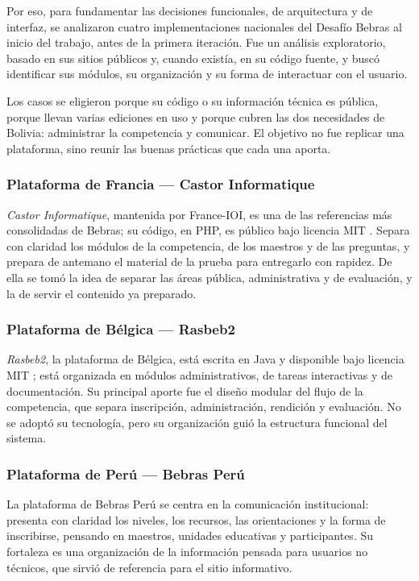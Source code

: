 Por eso, para fundamentar las decisiones funcionales, de arquitectura y de interfaz, se analizaron cuatro implementaciones nacionales del Desafío Bebras al inicio del trabajo, antes de la primera iteración. Fue un análisis exploratorio, basado en sus sitios públicos y, cuando existía, en su código fuente, y buscó identificar sus módulos, su organización y su forma de interactuar con el usuario.

Los casos se eligieron porque su código o su información técnica es pública, porque llevan varias ediciones en uso y porque cubren las dos necesidades de Bolivia: administrar la competencia y comunicar. El objetivo no fue replicar una plataforma, sino reunir las buenas prácticas que cada una aporta.

\subsubsection{Plataforma de Francia --- Castor Informatique}

\emph{Castor Informatique}, mantenida por France-IOI, es una de las referencias más consolidadas de Bebras; su código, en PHP, es público bajo licencia MIT \parencite{bebrasfrancia,franceioirepo}. Separa con claridad los módulos de la competencia, de los maestros y de las preguntas, y prepara de antemano el material de la prueba para entregarlo con rapidez. De ella se tomó la idea de separar las áreas pública, administrativa y de evaluación, y la de servir el contenido ya preparado.

\subsubsection{Plataforma de Bélgica --- Rasbeb2}

\emph{Rasbeb2}, la plataforma de Bélgica, está escrita en Java y disponible bajo licencia MIT \parencite{bebrasbelgica,rasbeb2repo}; está organizada en módulos administrativos, de tareas interactivas y de documentación. Su principal aporte fue el diseño modular del flujo de la competencia, que separa inscripción, administración, rendición y evaluación. No se adoptó su tecnología, pero su organización guió la estructura funcional del sistema.

\subsubsection{Plataforma de Perú --- Bebras Perú}

La plataforma de Bebras Perú \parencite{bebrasperu} se centra en la comunicación institucional: presenta con claridad los niveles, los recursos, las orientaciones y la forma de inscribirse, pensando en maestros, unidades educativas y participantes. Su fortaleza es una organización de la información pensada para usuarios no técnicos, que sirvió de referencia para el sitio informativo.


